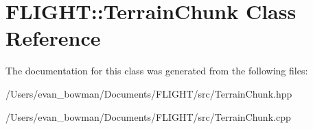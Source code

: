 \hypertarget{class_f_l_i_g_h_t_1_1_terrain_chunk}{}\section{F\+L\+I\+G\+HT\+:\+:Terrain\+Chunk Class Reference}
\label{class_f_l_i_g_h_t_1_1_terrain_chunk}


The documentation for this class was generated from the following files\+:\begin{DoxyCompactItemize}
\item 
/\+Users/evan\+\_\+bowman/\+Documents/\+F\+L\+I\+G\+H\+T/src/Terrain\+Chunk.\+hpp\item 
/\+Users/evan\+\_\+bowman/\+Documents/\+F\+L\+I\+G\+H\+T/src/Terrain\+Chunk.\+cpp\end{DoxyCompactItemize}

